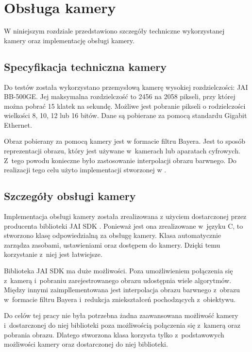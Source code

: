 \chapter{Obsługa kamery}
\label{cha:obslugakamery}

W niniejszym rozdziale przedstawiono szczegóły techniczne wykorzystanej kamery oraz implementację obsługi kamery.

\section{Specyfikacja techniczna kamery}
\label{sec:specyfikacjaKamery}

Do testów została wykorzystano przemysłową kamerę wysokiej rozdzielczości: JAI BB-500GE. Jej maksymalna rozdzielczość to 2456 na 2058 pikseli, przy której można pobrać 15 klatek na sekundę. Możliwe jest pobranie pikseli o rodzielczości wielkości 8, 10, 12 lub 16 bitów. Dane są pobierane za pomocą standardu Gigabit Ethernet. 

Obraz pobierany za pomocą kamery jest w formacie filtru Bayera. Jest to sposób reprezentacji obrazu, który jest używane w~kamerach lub aparatach cyfrowych. Z~tego powodu konieczne było zastosowanie interpolacji obrazu barwnego. Do realizacji tego celu użyto implementacji stworzonej w \cite{BFIOCL}.

\section{Szczegóły obsługi kamery}
\label{sec:szczegolyObslugiKamery}

Implementacja obsługi kamery została zrealizowana z użyciem dostarczonej przez producenta biblioteki JAI SDK \cite{JAISDK}. Ponieważ jest ona zrealizowane w~języku C, to stworzono klasę odpowiedzialną za obsługę kamery. Klasa automatycznie zarządza zasobami, ustawieniami oraz dostępem do kamery. Dzięki temu korzystanie z~niej jest łatwiejsze.

Biblioteka JAI SDK ma duże możliwości. Poza umożliwieniem połączenia się z~kamerą i~pobraniu zarejestrowanego obrazu udostępnia wiele algorytmów. Między innymi zaimpllementowana jest interpolacja obrazu barwnego z~obrazu w~formacie filtru Bayera i~redukcja zniekształceń pochodzących z~obiektywu.

Do celów tej pracy nie była potrzebna żadna zaawansowana możliwość kamery i~dostarczonej do niej biblioteki poza możliwością połączenia się z~kamerą oraz pobrania obrazu. Dlatego stworzona klasa korzysta tylko z~podstawowych możliwości kamery oraz dostarczonej do niej biblioteki.


